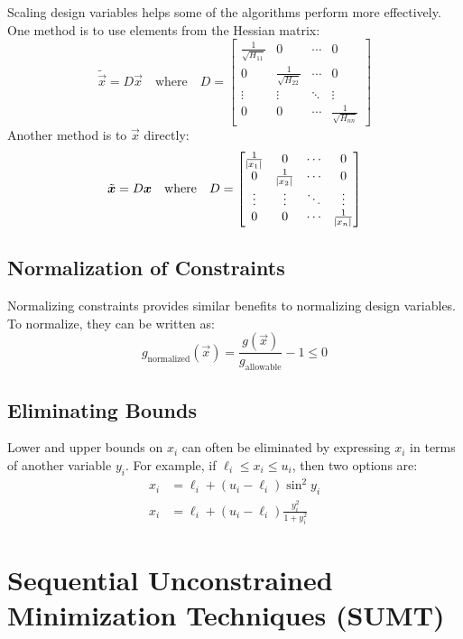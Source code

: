 \documentclass{article}
\begin{document}
Scaling design variables helps some of the algorithms perform more effectively. One method is to use
elements from the Hessian matrix:
\[\tilde{\vec{x}} = D \vec{x} \quad \textrm{where} \quad D =
\begin{bmatrix}
  \frac{1}{\sqrt{H_{11}}} & 0 & \cdots & 0 \\
  0 & \frac{1}{\sqrt{H_{22}}} & \cdots & 0 \\
  \vdots & \vdots & \ddots & \vdots \\
  0 & 0 & \cdots & \frac{1}{\sqrt{H_{nn}}}
\end{bmatrix}\]
Another method is to \(\vec{x}\) directly:
\[\tilde{\bm{x}} = D \bm{x} \quad \textrm{where} \quad D =
\begin{bmatrix}
  \frac{1}{\abs{x_1}} & 0 & \cdots & 0 \\
  0 & \frac{1}{\abs{x_2}} & \cdots & 0 \\
  \vdots & \vdots & \ddots & \vdots \\
  0 & 0 & \cdots & \frac{1}{\abs{x_n}}
\end{bmatrix}\]

\subsection{Normalization of Constraints}

Normalizing constraints provides similar benefits to normalizing design variables. To normalize,
they can be written as:
\[g_\textrm{normalized}(\vec{x}) = \frac{g(\vec{x})}{g_\textrm{allowable}} - 1 \le 0\]

\subsection{Eliminating Bounds}

Lower and upper bounds on \(x_i\) can often be eliminated by expressing \(x_i\) in terms of another
variable \(y_i\). For example, if \(\ell_i \le x_i \le u_i\), then two options are:
\begin{align*}
  x_i &= \ell_i + (u_i - \ell_i) \sin^2 y_i \\
  x_i &= \ell_i + (u_i - \ell_i) \frac{y_i^2}{1 + y_i^2}
\end{align*}

\section{Sequential Unconstrained Minimization Techniques (SUMT)}
\end{document}
